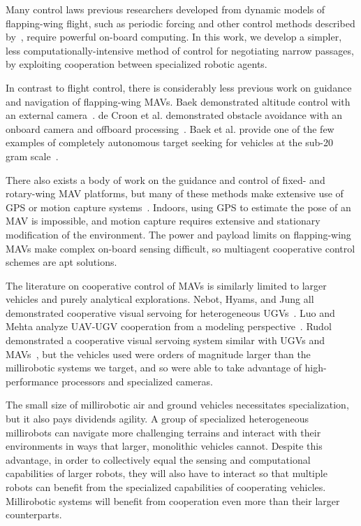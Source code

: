 \documentclass{aamas2013}
\begin{document}
Many control laws previous researchers developed from dynamic models of 
flapping-wing flight, such as periodic forcing and other control methods 
described by~\cite{doman:dynamics}\cite{khan:longitudinal_control}\cite{leonard:averaging}, 
require powerful on-board computing. In this work, we develop a simpler, 
less computationally-intensive method of control for negotiating narrow 
passages, by exploiting cooperation between specialized robotic agents.

In contrast to flight control, there is considerably less previous work on 
guidance and navigation of flapping-wing MAVs. Baek demonstrated altitude 
control with an external camera~\cite{baek:altitude}. de Croon et al. 
demonstrated obstacle avoidance with an onboard camera and offboard 
processing~\cite{delfly:avoid}. Baek et al. provide one of the few examples 
of completely autonomous target seeking for vehicles at the sub-20 gram 
scale~\cite{baek:tracking}.

There also exists a body of work on the guidance and control of fixed- and 
rotary-wing MAV platforms, but many of these methods make extensive use of 
GPS or motion capture systems~\cite{kingston:timeattitude}\cite{kanade:3dvision}. 
Indoors, using GPS to estimate the pose of an MAV is impossible, and motion 
capture requires extensive and stationary modification of the environment. 
The power and payload limits on flapping-wing MAVs make complex on-board 
sensing difficult, so multiagent cooperative control schemes are apt 
solutions.

The literature on cooperative control of MAVs is similarly limited to larger
vehicles and purely analytical explorations. Nebot, Hyams, and Jung all 
demonstrated cooperative visual servoing for heterogeneous UGVs~\cite{Nebot2003Agents}\cite{Hyams1999Cooperative}\cite{Jung1998Range}. 
Luo and Mehta analyze  UAV-UGV cooperation from a modeling perspective~\cite{Luo2011Air}\cite{Mehta2006Adaptive}. 
Rudol demonstrated a cooperative visual servoing system similar with 
UGVs and MAVs~\cite{Rudol2008Micro}, but the vehicles used were orders of 
magnitude larger than the millirobotic systems we target, and so were able 
to take advantage of high-performance processors and specialized cameras.

The small size of millirobotic air and ground vehicles necessitates 
specialization, but it also pays dividends agility. A group of specialized 
heterogeneous millirobots can navigate more challenging terrains and 
interact with their environments in ways that larger, monolithic vehicles 
cannot. Despite this advantage, in order to collectively equal the sensing and 
computational capabilities of larger robots, they will also have to interact 
so that multiple robots can benefit from the specialized capabilities of 
cooperating vehicles. Millirobotic systems will benefit from cooperation 
even more than their larger counterparts. 
\end{document}
